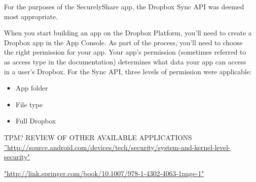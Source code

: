 For the purposes of the SecurelyShare app, the Dropbox Sync API was deemed most appropriate.  

When you start building an app on the Dropbox Platform, you'll need to create a Dropbox app in the App Console. As part of the process, you'll need to choose the right permission for your app. Your app's permission (sometimes referred to as access type in the documentation) determines what data your app can access in a user's Dropbox.  For the Sync API, three levels of permission were applicable:
\begin{itemize}
\item App folder
\item File type
\item Full Dropbox

\end{itemize}


TPM?
REVIEW OF OTHER AVAILABLE APPLICATIONS
\hyperref[label_name]{''http://source.android.com/devices/tech/security/system-and-kernel-level-security"}



\hyperref[label_name2]{"http://link.springer.com/book/10.1007/978-1-4302-4063-1page-1"}

